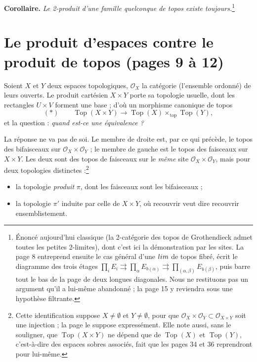\documentclass[11pt,a4paper]{article}
\begin{document}
\textbf{Corollaire.} \emph{Le 2-produit d'une famille quelconque de topos
existe toujours.}\footnote{Énoncé aujourd'hui classique (la 2-catégorie des
topos de Grothendieck admet toutes les petites 2-limites), dont c'est ici la
démonstration par les sites. La page 8 entreprend ensuite le cas général d'une
$\varprojlim$ de topos fibré, écrit le diagramme des trois étages
$\prod_{i} E_{i} \rightrightarrows \prod_{\alpha} E_{b(\alpha)}
\rightrightarrows \prod_{(\alpha,\beta)} E_{b(\beta)}$, puis barre tout le bas
de la page de deux longues diagonales. Nous ne restituons pas un argument
qu'il a lui-même abandonné ; la page 15 y reviendra sous une hypothèse
filtrante.}

\section*{Le produit d'espaces contre le produit de topos (pages 9 à 12)}

Soient $X$ et $Y$ deux espaces topologiques, $\mathcal{O}_{X}$ la catégorie
(l'ensemble ordonné) de leurs ouverts. Le produit cartésien $X \times Y$ porte
sa topologie usuelle, dont les rectangles $U \times V$ forment une base ; d'où
un morphisme canonique de topos
\[
(*) \qquad \operatorname{Top}(X \times Y) \longrightarrow
\operatorname{Top}(X) \times_{\mathrm{top}} \operatorname{Top}(Y),
\]
et la question : \emph{quand est-ce une équivalence ?}

La réponse ne va pas de soi. Le membre de droite est, par ce qui précède, le topos des
bifaisceaux sur $\mathcal{O}_{X} \times \mathcal{O}_{Y}$ ; le membre de gauche
est le topos des faisceaux sur $X \times Y$. Les deux sont des topos de
faisceaux sur le \emph{même} site $\mathcal{O}_{X} \times \mathcal{O}_{Y}$,
mais pour deux topologies distinctes :\footnote{Cette identification suppose
$X \neq \emptyset$ et $Y \neq \emptyset$, pour que
$\mathcal{O}_{X} \times \mathcal{O}_{Y} \subset \mathcal{O}_{X \times Y}$ soit
une injection ; la page le suppose expressément. Elle note aussi, sans le
souligner, que $\operatorname{Top}(X \times Y)$ ne dépend que de
$\operatorname{Top}(X)$ et $\operatorname{Top}(Y)$, c'est-à-dire des espaces
sobres associés, fait que les pages 34 et 36 reprendront pour lui-même.}

\begin{itemize}
\item la topologie \emph{produit} $\pi$, dont les faisceaux sont les
bifaisceaux ;
\item la topologie $\pi'$ induite par celle de $X \times Y$, où recouvrir veut
dire recouvrir ensemblistement.
\end{itemize}
\end{document}
